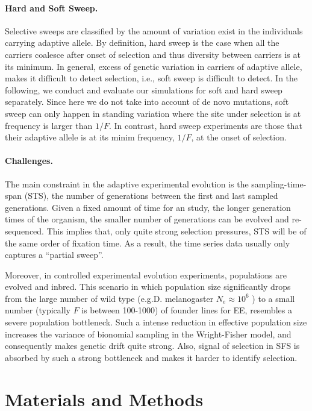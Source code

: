 \documentclass[11pt]{article}
\begin{document}
\paragraph{Hard and Soft Sweep.}
Selective sweeps are classified by the amount of 
variation exist in the individuals carrying adaptive allele. By definition, 
hard sweep is the case when all the carriers coalesce after onset of selection 
and thus diversity between carriers is at its minimum. 
In general, excess of genetic variation in carriers of adaptive allele, makes 
it difficult to detect selection, i.e., soft sweep is difficult to detect. 
In the following, we conduct and evaluate our simulations for soft and hard 
sweep separately. Since here we do not take into account of de novo mutations, 
soft sweep can only happen in standing variation 
where the site under selection is at frequency is larger than $1/F$. In 
contrast, hard sweep experiments are those that their adaptive allele is at its 
minim frequency, $1/F$, at the onset of selection.


\paragraph{Challenges.}
The main constraint in the adaptive experimental evolution is the
sampling-time-span (STS), the number of generations between the first
and last sampled generations. Given a fixed amount of time for an
study, the longer generation times of the organism, the smaller number
of generations can be evolved and re-sequenced.  This implies that,
only quite strong selection pressures, STS will be of the same order
of fixation time. As a result, the time series data usually only
captures a ``partial sweep''.

Moreover, in controlled experimental evolution experiments,
populations are evolved and inbred. This scenario in which population
size significantly drops from the large number of wild type
(e.g.D. melanogaster $N_e\approx10^6$ ) to a small number (typically
$F$ is between 100-1000) of founder lines for EE, resembles a severe
population bottleneck.  Such a intense reduction in effective
population size increases the variance of bionomial sampling in the
Wright-Fisher model, and consequently makes genetic drift quite
strong. Also, signal of selection in SFS is absorbed by such a strong
bottleneck and makes it harder to identify selection.


\section{Materials and Methods}
\end{document}
